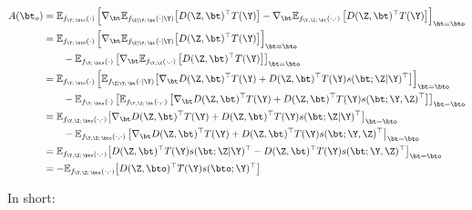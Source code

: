 \begin{align}
    A(\bt_o) &= \mathbb{E}_{f_{\Y;\,\bto}(\cdot)}\left[
    \nabla_\bt\mathbb{E}_{f_{\Z|\Y;\,\bt}(\cdot\mid \Y)}\!\left[ D(\Z,\bt)^\top T(\Y) \right]
    - \nabla_\bt\mathbb{E}_{f_{\Y, \Z;\,\bt}(\cdot, \cdot)}\left[ D(\Z,\bt)^\top T(\Y)\right]
    \right]_{\bt=\bto}\\
    &=\mathbb{E}_{f_{\Y;\,\bto}(\cdot)}\left[
    \nabla_\bt\mathbb{E}_{f_{\Z|\Y;\,\bt}(\cdot\mid \Y)}\!\left[ D(\Z,\bt)^\top T(\Y) \right]\right]_{\bt=\bto}\\
    &\qquad - \mathbb{E}_{f_{\Y;\,\bto}(\cdot)}\left[\nabla_\bt\mathbb{E}_{f_{\Y, \Z}(\cdot, \cdot)}\left[ D(\Z,\bt)^\top T(\Y)\right]
    \right]_{\bt=\bto}
    \\
    &=\mathbb{E}_{f_{\Y;\,\bto}(\cdot)}\left[
    \mathbb{E}_{f_{\Z|\Y;\,\bt}(\cdot\mid \Y)}\!\left[\nabla_\bt D(\Z,\bt)^\top T(\Y) + D(\Z,\bt)^\top T(\Y) s(\bt;\Z|\Y)^\top \right]\right]_{\bt=\bto}\\
    &\qquad - \mathbb{E}_{f_{\Y;\,\bto}(\cdot)}\left[\mathbb{E}_{f_{\Y, \Z;\,\bt}(\cdot, \cdot)}\left[\nabla_\bt D(\Z,\bt)^\top T(\Y) + D(\Z,\bt)^\top T(\Y) s(\bt;\Y,\Z)^\top \right]
    \right]_{\bt=\bto}
    \\
    &=
    \mathbb{E}_{f_{\Y,\Z;\,\bto}(\cdot, \cdot)}\!\left[\nabla_\bt D(\Z,\bt)^\top T(\Y) + D(\Z,\bt)^\top T(\Y) s(\bt;\Z|\Y)^\top \right]_{\bt=\bto}\\
    &\qquad -
    \mathbb{E}_{f_{\Y, \Z;\,\bto}(\cdot, \cdot)}\left[\nabla_\bt D(\Z,\bt)^\top T(\Y) + D(\Z,\bt)^\top T(\Y) s(\bt;\Y,\Z)^\top \right]_{\bt=\bto}
    \\
    &=
    \mathbb{E}_{f_{\Y,\Z;\,\bto}(\cdot, \cdot)}\!\left[D(\Z,\bt)^\top T(\Y) s(\bt;\Z|\Y)^\top  - D(\Z,\bt)^\top T(\Y) s(\bt;\Y,\Z)^\top \right]_{\bt=\bto}\\
    &=
    - \mathbb{E}_{f_{\Y,\Z;\,\bto}(\cdot, \cdot)}\!\left[D(\Z,\bto)^\top T(\Y) s(\bto;\Y)^\top \right]\\
\end{align}

In short:

